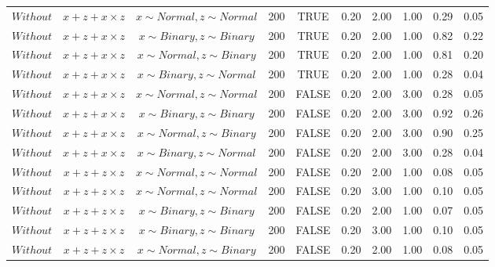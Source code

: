 \begin{longtable}{lccccccccc}
  $Without$ & $\textit{x} + \textit{z} + \textit{x} \times \textit{z}$ & $\textit{x} \sim Normal , \textit{z} \sim Normal$ & 200 & TRUE & 0.20 & 2.00 & 1.00 & 0.29 & 0.05 \\ 
  $Without$ & $\textit{x} + \textit{z} + \textit{x} \times \textit{z}$ & $\textit{x} \sim Binary, \textit{z} \sim Binary$ & 200 & TRUE & 0.20 & 2.00 & 1.00 & 0.82 & 0.22 \\ 
  $Without$ & $\textit{x} + \textit{z} + \textit{x} \times \textit{z}$ & $\textit{x} \sim Normal, \textit{z} \sim Binary$ & 200 & TRUE & 0.20 & 2.00 & 1.00 & 0.81 & 0.20 \\ 
  $Without$ & $\textit{x} + \textit{z} + \textit{x} \times \textit{z}$ & $\textit{x} \sim Binary, \textit{z} \sim Normal$ & 200 & TRUE & 0.20 & 2.00 & 1.00 & 0.28 & 0.04 \\ 
  $Without$ & $\textit{x} + \textit{z} + \textit{x} \times \textit{z}$ & $\textit{x} \sim Normal , \textit{z} \sim Normal$ & 200 & FALSE & 0.20 & 2.00 & 3.00 & 0.28 & 0.05 \\ 
  $Without$ & $\textit{x} + \textit{z} + \textit{x} \times \textit{z}$ & $\textit{x} \sim Binary, \textit{z} \sim Binary$ & 200 & FALSE & 0.20 & 2.00 & 3.00 & 0.92 & 0.26 \\ 
  $Without$ & $\textit{x} + \textit{z} + \textit{x} \times \textit{z}$ & $\textit{x} \sim Normal, \textit{z} \sim Binary$ & 200 & FALSE & 0.20 & 2.00 & 3.00 & 0.90 & 0.25 \\ 
  $Without$ & $\textit{x} + \textit{z} + \textit{x} \times \textit{z}$ & $\textit{x} \sim Binary, \textit{z} \sim Normal$ & 200 & FALSE & 0.20 & 2.00 & 3.00 & 0.28 & 0.04 \\ 
  $Without$ & $\textit{x} + \textit{z} + \textit{z} \times \textit{z}$ & $\textit{x} \sim Normal , \textit{z} \sim Normal$ & 200 & FALSE & 0.20 & 2.00 & 1.00 & 0.08 & 0.05 \\ 
  $Without$ & $\textit{x} + \textit{z} + \textit{z} \times \textit{z}$ & $\textit{x} \sim Normal , \textit{z} \sim Normal$ & 200 & FALSE & 0.20 & 3.00 & 1.00 & 0.10 & 0.05 \\ 
  $Without$ & $\textit{x} + \textit{z} + \textit{z} \times \textit{z}$ & $\textit{x} \sim Binary, \textit{z} \sim Binary$ & 200 & FALSE & 0.20 & 2.00 & 1.00 & 0.07 & 0.05 \\ 
  $Without$ & $\textit{x} + \textit{z} + \textit{z} \times \textit{z}$ & $\textit{x} \sim Binary, \textit{z} \sim Binary$ & 200 & FALSE & 0.20 & 3.00 & 1.00 & 0.10 & 0.05 \\ 
  $Without$ & $\textit{x} + \textit{z} + \textit{z} \times \textit{z}$ & $\textit{x} \sim Normal, \textit{z} \sim Binary$ & 200 & FALSE & 0.20 & 2.00 & 1.00 & 0.08 & 0.05 \\ 

\end{longtable}

